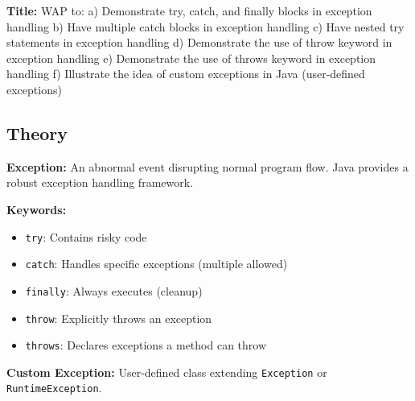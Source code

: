 \documentclass[10pt,a4paper]{article}
\begin{document}
\textbf{Title:} WAP to: a) Demonstrate try, catch, and finally blocks in exception handling b) Have multiple catch blocks in exception handling c) Have nested try statements in exception handling d) Demonstrate the use of throw keyword in exception handling e) Demonstrate the use of throws keyword in exception handling f) Illustrate the idea of custom exceptions in Java (user-defined exceptions)

\subsection*{Theory}
\textbf{Exception:} An abnormal event disrupting normal program flow. Java provides a robust exception handling framework.

\textbf{Keywords:}
\begin{itemize}
    \item \texttt{try}: Contains risky code
    \item \texttt{catch}: Handles specific exceptions (multiple allowed)
    \item \texttt{finally}: Always executes (cleanup)
    \item \texttt{throw}: Explicitly throws an exception
    \item \texttt{throws}: Declares exceptions a method can throw
\end{itemize}

\textbf{Custom Exception:} User-defined class extending \texttt{Exception} or \texttt{RuntimeException}.
\end{document}
